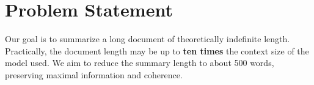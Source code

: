 \section{Problem Statement}
\label{sec:problem}

Our goal is to summarize a long document of theoretically indefinite length.
Practically, the document length may be up to \textbf{ten times} the context size
of the model used.
We aim to reduce the summary length to about 500 words, preserving maximal
information and coherence.
